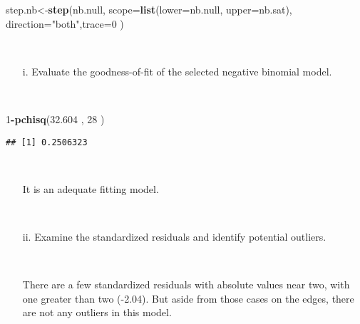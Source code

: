 \documentclass[]{article}
\newenvironment{Shaded}{\begin{snugshade}}{\end{snugshade}}
\newcommand{\KeywordTok}[1]{\textcolor[rgb]{0.13,0.29,0.53}{\textbf{#1}}}
\newcommand{\DataTypeTok}[1]{\textcolor[rgb]{0.13,0.29,0.53}{#1}}
\newcommand{\DecValTok}[1]{\textcolor[rgb]{0.00,0.00,0.81}{#1}}
\newcommand{\FloatTok}[1]{\textcolor[rgb]{0.00,0.00,0.81}{#1}}
\newcommand{\StringTok}[1]{\textcolor[rgb]{0.31,0.60,0.02}{#1}}
\newcommand{\OperatorTok}[1]{\textcolor[rgb]{0.81,0.36,0.00}{\textbf{#1}}}
\newcommand{\NormalTok}[1]{#1}
\begin{document}
\begin{Shaded}
\begin{Highlighting}[]
\NormalTok{step.nb<-}\KeywordTok{step}\NormalTok{(nb.null, }\DataTypeTok{scope=}\KeywordTok{list}\NormalTok{(}\DataTypeTok{lower=}\NormalTok{nb.null,    }\DataTypeTok{upper=}\NormalTok{nb.sat), }\DataTypeTok{direction=}\StringTok{"both"}\NormalTok{,}\DataTypeTok{trace=}\DecValTok{0}\NormalTok{  )}
\end{Highlighting}
\end{Shaded}

~

\begin{itemize} 
\item[i.] Evaluate the goodness-of-fit of the selected negative binomial model.
\end{itemize}

~

\begin{Shaded}
\begin{Highlighting}[]
\DecValTok{1}\OperatorTok{-}\KeywordTok{pchisq}\NormalTok{(}\FloatTok{32.604}\NormalTok{  , }\DecValTok{28}\NormalTok{ )}
\end{Highlighting}
\end{Shaded}

\begin{verbatim}
## [1] 0.2506323
\end{verbatim}

~

\begin{itemize} 
\item[] It is an adequate fitting model.
\end{itemize}

~

\begin{itemize} 
\item[ii.] Examine the standardized residuals and identify potential outliers.
\end{itemize}

~

\begin{itemize} 
\item[ ] There are a few standardized residuals with absolute values near two, with one greater than two (-2.04). But aside from those cases on the edges, there are not any outliers in this model.
\end{itemize}

~
\end{document}

